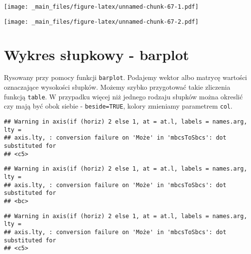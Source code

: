 \documentclass[
]{book}
\newenvironment{Shaded}{\begin{snugshade}}{\end{snugshade}}
\newcommand{\FunctionTok}[1]{\textcolor[rgb]{0.00,0.00,0.00}{#1}}
\newcommand{\NormalTok}[1]{#1}
\newcommand{\SpecialCharTok}[1]{\textcolor[rgb]{0.00,0.00,0.00}{#1}}
\begin{document}
\texttt{[image: \_main\_files/figure-latex/unnamed-chunk-67-1.pdf]}

\begin{Shaded}
\end{Shaded}

\texttt{[image: \_main\_files/figure-latex/unnamed-chunk-67-2.pdf]}

\hypertarget{wykres-sux142upkowy---barplot}{%
\section{Wykres słupkowy - barplot}\label{wykres-sux142upkowy---barplot}}

Rysowany przy pomocy funkcji \texttt{barplot}. Podajemy wektor albo matrycę wartości oznaczające wysokości słupków. Możemy szybko przygotować takie zliczenia funkcją \texttt{table}. W przypadku więcej niż jednego rodzaju słupków można okreslić czy mają być obok siebie - \texttt{beside=TRUE}, kolory zmieniamy parametrem \texttt{col}.

\begin{Shaded}
\end{Shaded}

\begin{verbatim}
## Warning in axis(if (horiz) 2 else 1, at = at.l, labels = names.arg, lty =
## axis.lty, : conversion failure on 'Może' in 'mbcsToSbcs': dot substituted for
## <c5>
\end{verbatim}

\begin{verbatim}
## Warning in axis(if (horiz) 2 else 1, at = at.l, labels = names.arg, lty =
## axis.lty, : conversion failure on 'Może' in 'mbcsToSbcs': dot substituted for
## <bc>
\end{verbatim}

\begin{verbatim}
## Warning in axis(if (horiz) 2 else 1, at = at.l, labels = names.arg, lty =
## axis.lty, : conversion failure on 'Może' in 'mbcsToSbcs': dot substituted for
## <c5>
\end{verbatim}
\end{document}
